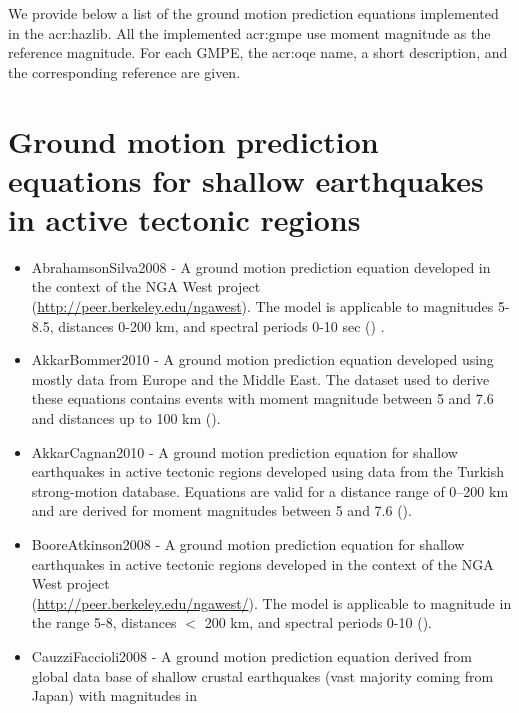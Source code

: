 \label{sec:gmpes_list}
We provide below a list of the ground motion prediction equations 
implemented in the \gls{acr:hazlib}. All the implemented \gls{acr:gmpe}
use moment magnitude as the reference magnitude. For each GMPE,
the \gls{acr:oqe} name, a short description, and the corresponding reference
are given.
%
\section{Ground motion prediction equations for shallow earthquakes 
    in active tectonic regions}
\begin{itemize} 
    \item AbrahamsonSilva2008 - A ground motion prediction equation 
        developed in the context of the NGA West project \hfill \\
        (\href{http://peer.berkeley.edu/ngawest/}{http://peer.berkeley.edu/ngawest}).
        The model is applicable to magnitudes 5-8.5, distances 0-200 km, and
        spectral periods 0-10 sec (\cite{abrahamson2008}) .
    \item AkkarBommer2010 - A ground motion prediction equation 
        developed using mostly data from Europe and the Middle East. The dataset 
        used to derive these equations contains events with moment 
        magnitude between 5 and 7.6 and distances up to 100 km (\cite{akkar2010}).
    \item AkkarCagnan2010 - A ground motion prediction equation for shallow
        earthquakes in active tectonic regions developed using data from the 
        Turkish strong-motion database. Equations are valid for a distance 
        range of 0–200 km and are derived for moment magnitudes 
        between 5 and 7.6 (\cite{akkar2010a}).
    \item BooreAtkinson2008 - A ground motion prediction equation 
        for shallow earthquakes in active tectonic regions developed in 
        the context of the NGA West project \hfill \\
        (\href{http://peer.berkeley.edu/ngawest/}
        {http://peer.berkeley.edu/ngawest/}).
        The model is applicable to magnitude in the range 5-8, distances $<$ 200 km,
        and spectral periods 0-10 (\cite{boore2008}).
    \item CauzziFaccioli2008 - A ground motion prediction equation 
        derived from global data base of shallow crustal earthquakes (vast majority coming from Japan) with magnitudes in

\end{itemize}
